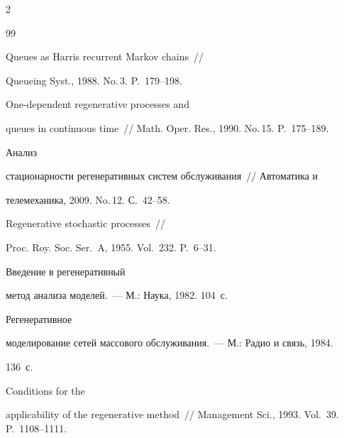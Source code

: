 \begin{multicols}{2}
{{\begin{thebibliography}{99}


 Queues as Harris recurrent Markov chains~//


Queueing Syst., 1988. No.\,3.  P.~179--198.







 One-dependent regenerative processes and


    queues in continuous time~// Math. Oper. Res.,  1990. No.\,15. P.~175--189.







 Анализ


    стационарности регенеративных систем обслуживания~//  Автоматика и


    телемеханика, 2009. No.\,12.  С.~42--58.







 Regenerative stochastic processes~//


    Proc. Roy. Soc.  Ser.~A, 1955. Vol.~232. P.~6--31.










 Введение в регенеративный


    метод анализа моделей.~--- М.: Наука, 1982. 104~с.







 Регенеративное


    моделирование сетей массового обслуживания.~--- М.: Радио и связь, 1984.


    136~с.


    




 Conditions for the


    applicability of the regenerative method~// Management Sci., 1993. Vol.~39. P.~1108--1111.






\end{thebibliography}}}
\end{multicols}
